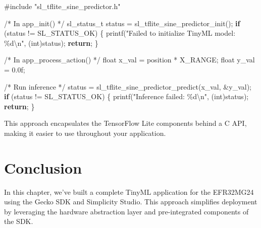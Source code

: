 \documentclass[
  9pt,
  letterpaper,
  abstract,
  titlepage]{scrbook}
\newenvironment{Shaded}{\begin{snugshade}}{\end{snugshade}}
\newcommand{\BuiltInTok}[1]{\textcolor[rgb]{0.00,0.23,0.31}{#1}}
\newcommand{\CommentTok}[1]{\textcolor[rgb]{0.37,0.37,0.37}{#1}}
\newcommand{\ControlFlowTok}[1]{\textcolor[rgb]{0.00,0.23,0.31}{\textbf{#1}}}
\newcommand{\DataTypeTok}[1]{\textcolor[rgb]{0.68,0.00,0.00}{#1}}
\newcommand{\FloatTok}[1]{\textcolor[rgb]{0.68,0.00,0.00}{#1}}
\newcommand{\ImportTok}[1]{\textcolor[rgb]{0.00,0.46,0.62}{#1}}
\newcommand{\NormalTok}[1]{\textcolor[rgb]{0.00,0.23,0.31}{#1}}
\newcommand{\OperatorTok}[1]{\textcolor[rgb]{0.37,0.37,0.37}{#1}}
\newcommand{\PreprocessorTok}[1]{\textcolor[rgb]{0.68,0.00,0.00}{#1}}
\newcommand{\SpecialCharTok}[1]{\textcolor[rgb]{0.37,0.37,0.37}{#1}}
\newcommand{\StringTok}[1]{\textcolor[rgb]{0.13,0.47,0.30}{#1}}
\begin{document}
\begin{Shaded}
\begin{Highlighting}[]
\PreprocessorTok{\#include }\ImportTok{"sl\_tflite\_sine\_predictor.h"}

\CommentTok{/* In app\_init() */}
\NormalTok{sl\_status\_t status }\OperatorTok{=}\NormalTok{ sl\_tflite\_sine\_predictor\_init}\OperatorTok{();}
\ControlFlowTok{if} \OperatorTok{(}\NormalTok{status }\OperatorTok{!=}\NormalTok{ SL\_STATUS\_OK}\OperatorTok{)} \OperatorTok{\{}
\NormalTok{  printf}\OperatorTok{(}\StringTok{"Failed to initialize TinyML model: }\SpecialCharTok{\%d\textbackslash{}n}\StringTok{"}\OperatorTok{,} \OperatorTok{(}\DataTypeTok{int}\OperatorTok{)}\NormalTok{status}\OperatorTok{);}
  \ControlFlowTok{return}\OperatorTok{;}
\OperatorTok{\}}

\CommentTok{/* In app\_process\_action() */}
\DataTypeTok{float}\NormalTok{ x\_val }\OperatorTok{=}\NormalTok{ position }\OperatorTok{*}\NormalTok{ X\_RANGE}\OperatorTok{;}
\DataTypeTok{float}\NormalTok{ y\_val }\OperatorTok{=} \FloatTok{0.0}\BuiltInTok{f}\OperatorTok{;}

\CommentTok{/* Run inference */}
\NormalTok{status }\OperatorTok{=}\NormalTok{ sl\_tflite\_sine\_predictor\_predict}\OperatorTok{(}\NormalTok{x\_val}\OperatorTok{,} \OperatorTok{\&}\NormalTok{y\_val}\OperatorTok{);}
\ControlFlowTok{if} \OperatorTok{(}\NormalTok{status }\OperatorTok{!=}\NormalTok{ SL\_STATUS\_OK}\OperatorTok{)} \OperatorTok{\{}
\NormalTok{  printf}\OperatorTok{(}\StringTok{"Inference failed: }\SpecialCharTok{\%d\textbackslash{}n}\StringTok{"}\OperatorTok{,} \OperatorTok{(}\DataTypeTok{int}\OperatorTok{)}\NormalTok{status}\OperatorTok{);}
  \ControlFlowTok{return}\OperatorTok{;}
\OperatorTok{\}}
\end{Highlighting}
\end{Shaded}

This approach encapsulates the TensorFlow Lite components behind a C
API, making it easier to use throughout your application.

\section{Conclusion}\label{conclusion-2}

In this chapter, we've built a complete TinyML application for the
EFR32MG24 using the Gecko SDK and Simplicity Studio. This approach
simplifies deployment by leveraging the hardware abstraction layer and
pre-integrated components of the SDK.
\end{document}
